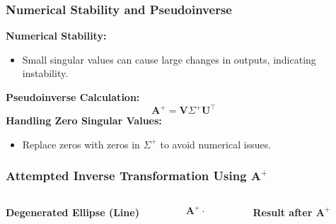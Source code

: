 \documentclass[aspectratio=169]{beamer}
\begin{document}
\begin{frame}
\frametitle{Numerical Stability and Pseudoinverse} \pause
\textbf{Numerical Stability:}
\begin{itemize}
    \item Small singular values can cause large changes in outputs, indicating instability.
\end{itemize}
\pause
\textbf{Pseudoinverse Calculation:}
\[
\mathbf{A}^+ = \mathbf{V} \Sigma^+ \mathbf{U}^\top
\]
\pause
\textbf{Handling Zero Singular Values:}
\begin{itemize}
    \item Replace zeros with zeros in \( \Sigma^+ \) to avoid numerical issues.
\end{itemize}
\end{frame}


\begin{frame}
\frametitle{Attempted Inverse Transformation Using \(\mathbf{A}^+\)}

\begin{columns}
    \begin{column}{0.4\textwidth}
        \centering
        \textbf{Degenerated Ellipse (Line)}\\[0.5cm]
        
    \end{column}
\pause
    \begin{column}{0.2\textwidth}
        \centering
        \( \mathbf{A}^+ \cdot \)\\[1em]
    \end{column}
\pause
    \begin{column}{0.4\textwidth}
        \centering
        \textbf{Result after \(\mathbf{A}^+\)}
\end{column}
\end{columns}
\end{frame}
\end{document}
